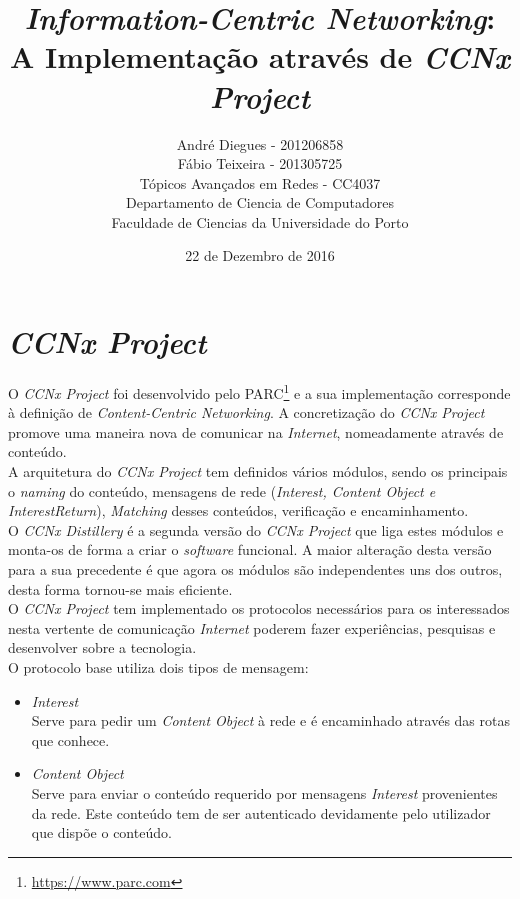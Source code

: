 \documentclass{report}
\title{\textit{Information-Centric Networking}:\\A Implementação através de \textit{CCNx Project}} %
\author{André Diegues - 201206858 \\ Fábio Teixeira - 201305725\\ %
		T\'{o}picos Avan\c{c}ados em Redes - CC4037\\
		Departamento de Ciencia de Computadores\\
		Faculdade de Ciencias da Universidade do Porto
}
\date{22 de Dezembro de 2016} %
\begin{document}
\maketitle %
\tableofcontents

\section{\textit{CCNx Project}}

O \textit{CCNx Project} foi desenvolvido pelo PARC\footnote{\url{https://www.parc.com}} e a sua implementação corresponde à definição de \textit{Content-Centric Networking}\cite{content}. A concretização do \textit{CCNx Project} promove uma maneira nova de comunicar na \textit{Internet}, nomeadamente através de conteúdo. \\

A arquitetura do \textit{CCNx Project} tem definidos vários módulos, sendo os principais o \textit{naming} do conteúdo, mensagens de rede (\textit{Interest, Content Object e InterestReturn}), \textit{Matching} desses conteúdos, verificação e encaminhamento\cite{ccnx}. \\

O \textit{CCNx Distillery} é a segunda versão do \textit{CCNx Project} que liga estes módulos e monta-os de forma a criar o \textit{software} funcional. A maior alteração desta versão para a sua precedente é que agora os módulos são independentes uns dos outros, desta forma tornou-se mais eficiente. \\

O \textit{CCNx Project} tem implementado os protocolos necessários para os interessados nesta vertente de comunicação \textit{Internet} poderem fazer experiências, pesquisas e desenvolver sobre a tecnologia.\\

O protocolo base utiliza dois tipos de mensagem:

\begin{itemize}
\item \textit{Interest}\\

Serve para pedir um \textit{Content Object} à rede e é encaminhado através das rotas que conhece.\\

\item \textit{Content Object}\\

Serve para enviar o conteúdo requerido por mensagens \textit{Interest} provenientes da rede. Este conteúdo tem de ser autenticado devidamente pelo utilizador que dispõe o conteúdo.\\

\end{itemize}
\end{document}
